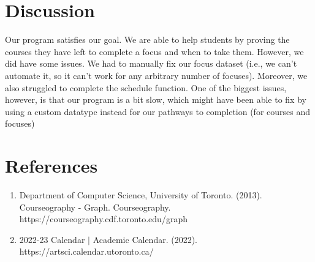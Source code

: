 \documentclass[fontsize=11pt]{article}
\begin{document}
\section*{Discussion}
Our program satisfies our goal. We are able to help students by proving the courses they have left to complete a focus and when to take them. However, we did have some issues. We had to manually fix our focus dataset (i.e., we can't automate it, so it can't work for any arbitrary number of focuses). Moreover, we also struggled to complete the schedule function. One of the biggest issues, however, is that our program is a bit slow, which might have been able to fix by using a custom datatype instead for our pathways to completion (for courses and focuses)


\section*{References}
\begin{enumerate}
    \item Department of Computer Science, University of Toronto. (2013). Courseography - Graph. Courseography. https://courseography.cdf.toronto.edu/graph
    \item 2022-23 Calendar $\vert$ Academic Calendar. (2022). https://artsci.calendar.utoronto.ca/
\end{enumerate}
    



\end{document}

